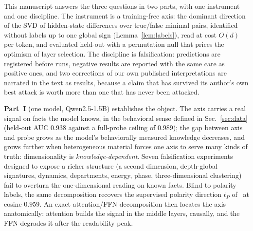 \documentclass[11pt]{article}
\begin{document}
This manuscript answers the three questions in two parts, with one
instrument and one discipline. The instrument is a training-free axis: the
dominant direction of the SVD of hidden-state differences over true/false
minimal pairs, identified without labels up to one global sign
(Lemma~\ref{lem:labels}), read at cost $O(d)$ per token, and evaluated
held-out with a permutation null that prices the optimism of layer
selection. The discipline is falsification: predictions are registered
before runs, negative results are reported with the same care as positive
ones, and two corrections of our own published interpretations are narrated
in the text as results, because a claim that has survived its author's own best
attack is worth more than one that has never been attacked.

\textbf{Part~I} (one model, Qwen2.5-1.5B) establishes the object. The axis
carries a real signal on facts the model knows, in the behavioral sense
defined in Sec.~\ref{sec:data} (held-out AUC $0.938$
against a full-probe ceiling of $0.989$); the gap between axis and probe
grows as the model's behaviorally measured knowledge decreases, and grows
further when heterogeneous material forces one axis to serve many kinds of
truth: dimensionality is \emph{knowledge-dependent}. Seven falsification
experiments designed to expose a richer structure (a second dimension,
depth-global signatures, dynamics, departments, energy, phase,
three-dimensional clustering) fail to overturn the one-dimensional reading
on known facts. Blind to polarity labels, the same decomposition recovers
the supervised polarity direction $t_P$ of~\cite{burger2024} at cosine
$0.959$. An exact attention/FFN decomposition then locates the axis
anatomically: attention builds the signal in the middle layers, causally,
and the FFN degrades it after the readability peak.
\end{document}
